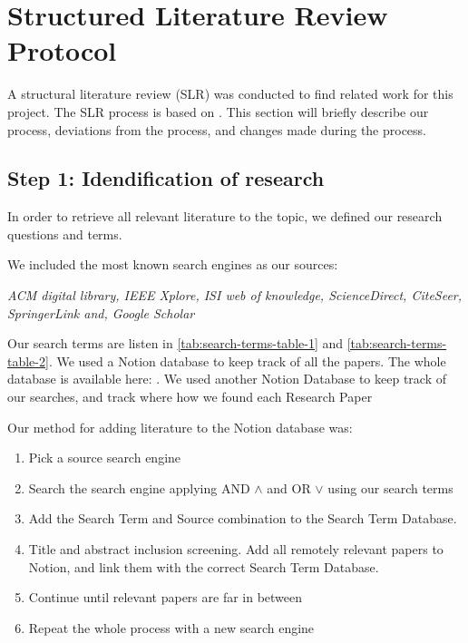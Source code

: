 
\section{Structured Literature Review Protocol}
\label{section:BT:SLR}

A structural literature review (SLR) was conducted to find related work for this project.
The SLR process is based on \cite{AndersKofod-Petersen2018}.
This section will briefly describe our process, deviations from the process,
and changes made during the process.

\subsection{Step 1: Idendification of research}
In order to retrieve all relevant literature to the topic, we defined our
research questions and terms.

We included the most known search engines as our sources:

\textit{
ACM digital library,
IEEE Xplore,
ISI web of knowledge,
ScienceDirect,
CiteSeer,
SpringerLink and,
Google Scholar
}

Our search terms are listen in \autoref{tab:search-terms-table-1} and \autoref{tab:search-terms-table-2}.
We used a Notion database to keep track of all the papers. The whole database is available here: \cite{slrdatabase}.
We used another Notion Database to keep track of our searches, and track where how we found each Research Paper
\cite{searchtermtable}

Our method for adding literature to the Notion database was:
\begin{enumerate}
    \item Pick a source search engine
    \item Search the search engine applying AND $\wedge$ and OR $\vee$ using our search terms
    \item Add the Search Term and Source combination to the Search Term Database.
    \item Title and abstract inclusion screening. Add all remotely relevant papers to Notion, and link them with the correct Search Term Database.
    \item Continue until relevant papers are far in between
    \item Repeat the whole process with a new search engine
\end{enumerate}

